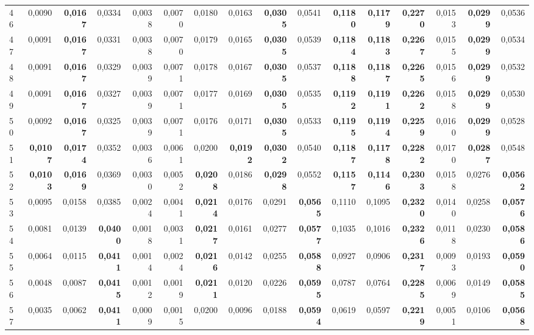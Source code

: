 \begin{table}[htp!]
\begin{adjustwidth}{-2cm}{}
\begin{tabular}{ l | *{15}{| r}}
46	&	0,0090	&	\textbf{0,0167}	&	0,0334	&	0,0038	&	0,0070	&	0,0180	&	0,0163	&	\textbf{0,0305}	&	0,0541	&	\textbf{0,1180}	&	\textbf{0,1179}	&	\textbf{0,2270}	&	0,0153	&	\textbf{0,0299}	&	0,0536	\\
47	&	0,0091	&	\textbf{0,0167}	&	0,0331	&	0,0038	&	0,0070	&	0,0179	&	0,0165	&	\textbf{0,0305}	&	0,0539	&	\textbf{0,1184}	&	\textbf{0,1183}	&	\textbf{0,2267}	&	0,0155	&	\textbf{0,0299}	&	0,0534	\\
48	&	0,0091	&	\textbf{0,0167}	&	0,0329	&	0,0039	&	0,0071	&	0,0178	&	0,0167	&	\textbf{0,0305}	&	0,0537	&	\textbf{0,1188}	&	\textbf{0,1187}	&	\textbf{0,2265}	&	0,0156	&	\textbf{0,0299}	&	0,0532	\\
49	&	0,0091	&	\textbf{0,0167}	&	0,0327	&	0,0039	&	0,0071	&	0,0177	&	0,0169	&	\textbf{0,0305}	&	0,0535	&	\textbf{0,1192}	&	\textbf{0,1191}	&	\textbf{0,2262}	&	0,0158	&	\textbf{0,0299}	&	0,0530	\\
50	&	0,0092	&	\textbf{0,0167}	&	0,0325	&	0,0039	&	0,0071	&	0,0176	&	0,0171	&	\textbf{0,0305}	&	0,0533	&	\textbf{0,1195}	&	\textbf{0,1194}	&	\textbf{0,2259}	&	0,0160	&	\textbf{0,0299}	&	0,0528	\\
51	&	\textbf{0,0107}	&	\textbf{0,0174}	&	0,0352	&	0,0036	&	0,0061	&	0,0200	&	\textbf{0,0192}	&	\textbf{0,0302}	&	0,0540	&	\textbf{0,1187}	&	\textbf{0,1178}	&	\textbf{0,2282}	&	0,0170	&	\textbf{0,0287}	&	0,0548	\\
52	&	\textbf{0,0103}	&	\textbf{0,0169}	&	0,0369	&	0,0030	&	0,0052	&	\textbf{0,0208}	&	0,0186	&	\textbf{0,0298}	&	0,0552	&	\textbf{0,1157}	&	\textbf{0,1146}	&	\textbf{0,2303}	&	0,0158	&	0,0276	&	\textbf{0,0562}	\\
53	&	0,0095	&	0,0158	&	0,0385	&	0,0024	&	0,0041	&	\textbf{0,0214}	&	0,0176	&	0,0291	&	\textbf{0,0565}	&	0,1110	&	0,1095	&	\textbf{0,2320}	&	0,0140	&	0,0258	&	\textbf{0,0576}	\\
54	&	0,0081	&	0,0139	&	\textbf{0,0400}	&	0,0018	&	0,0031	&	\textbf{0,0217}	&	0,0161	&	0,0277	&	\textbf{0,0577}	&	0,1035	&	0,1016	&	\textbf{0,2326}	&	0,0118	&	0,0230	&	\textbf{0,0586}	\\
55	&	0,0064	&	0,0115	&	\textbf{0,0411}	&	0,0014	&	0,0024	&	\textbf{0,0216}	&	0,0142	&	0,0255	&	\textbf{0,0588}	&	0,0927	&	0,0906	&	\textbf{0,2317}	&	0,0093	&	0,0193	&	\textbf{0,0590}	\\
56	&	0,0048	&	0,0087	&	\textbf{0,0415}	&	0,0012	&	0,0019	&	\textbf{0,0211}	&	0,0120	&	0,0226	&	\textbf{0,0595}	&	0,0787	&	0,0764	&	\textbf{0,2285}	&	0,0069	&	0,0149	&	\textbf{0,0585}	\\
57	&	0,0035	&	0,0062	&	\textbf{0,0411}	&	0,0009	&	0,0015	&	0,0200	&	0,0096	&	0,0188	&	\textbf{0,0594}	&	0,0619	&	0,0597	&	\textbf{0,2219}	&	0,0051	&	0,0106	&	\textbf{0,0568}	\\

\end{tabular}
\end{adjustwidth}
\end{table}
